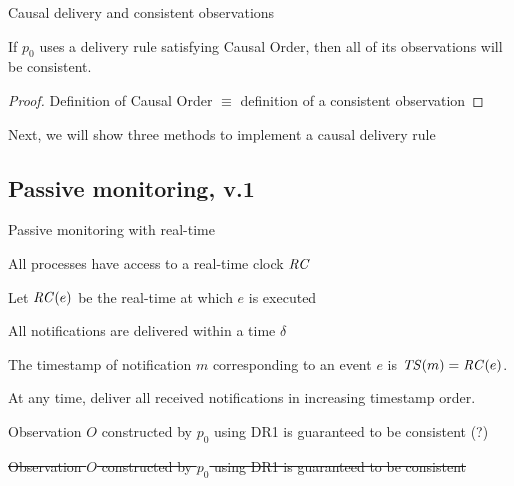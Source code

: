 \begin{frame}{Causal delivery and consistent observations}

\begin{theorem}
If $p_0$ uses a delivery rule satisfying Causal Order, then all of its
observations will be consistent.
\end{theorem}

\bigskip
\begin{proof}
Definition of Causal Order $\equiv$ definition of a consistent observation
\end{proof}

\bigskip
Next, we will show three methods to implement a causal delivery rule





\end{frame}


\subsection{Passive monitoring, v.1}

\begin{frame}{Passive monitoring with real-time}

\BI
\item All processes have access to a real-time clock $\mathit{RC}$
\item Let $\mathit{RC}(e)$ be the real-time at which $e$ is executed
\item All notifications are delivered within a time $\delta$
\item The timestamp of notification $m$ corresponding to an event $e$
  is $\mathit{TS}(m) = \mathit{RC}(e)$.
\EI
\begin{definition}
At any time, deliver all received notifications
in increasing timestamp order.
\end{definition}
\begin{overprint}
\begin{theorem}
\noindent
Observation $O$ constructed by $p_0$ using DR1 is guaranteed to be
consistent (?)
\end{theorem}
\begin{theorem}
\sout{\noindent
Observation $O$ constructed by $p_0$ using DR1 is guaranteed to be
consistent
}
\end{theorem}
\end{overprint}


\end{frame}

